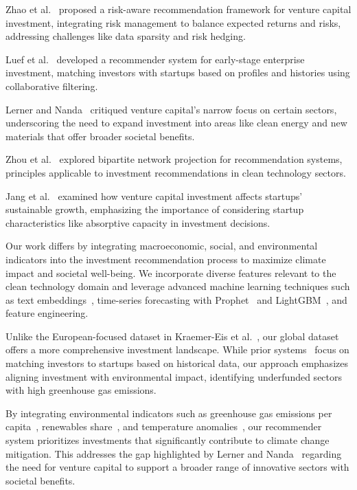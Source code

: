 \documentclass[sigconf]{acmart}
\begin{document}
Zhao et al.~\cite{ZhaoZhangWang2015} proposed a risk-aware recommendation framework for venture capital investment, integrating risk management to balance expected returns and risks, addressing challenges like data sparsity and risk hedging.

Luef et al.~\cite{LuefOhrfandlSacharidisWerthner2020} developed a recommender system for early-stage enterprise investment, matching investors with startups based on profiles and histories using collaborative filtering.

Lerner and Nanda~\cite{LernerNanda2020} critiqued venture capital's narrow focus on certain sectors, underscoring the need to expand investment into areas like clean energy and new materials that offer broader societal benefits.

Zhou et al.~\cite{ZhouRenMedoZhang2007} explored bipartite network projection for recommendation systems, principles applicable to investment recommendations in clean technology sectors.

Jang et al.~\cite{JangLeeYoon2020} examined how venture capital investment affects startups' sustainable growth, emphasizing the importance of considering startup characteristics like absorptive capacity in investment decisions.

Our work differs by integrating macroeconomic, social, and environmental indicators into the investment recommendation process to maximize climate impact and societal well-being. We incorporate diverse features relevant to the clean technology domain and leverage advanced machine learning techniques such as text embeddings~\cite{reimers-2019-sentence-bert}, time-series forecasting with Prophet~\cite{taylor2018forecasting} and LightGBM~\cite{ke2017lightgbm}, and feature engineering.

Unlike the European-focused dataset in Kraemer-Eis et al.~\cite{KraemerEisBotsariLangPal2023}, our global dataset offers a more comprehensive investment landscape. While prior systems~\cite{ZhaoZhangWang2015,LuefOhrfandlSacharidisWerthner2020} focus on matching investors to startups based on historical data, our approach emphasizes aligning investment with environmental impact, identifying underfunded sectors with high greenhouse gas emissions.

By integrating environmental indicators such as greenhouse gas emissions per capita~\cite{OWIDTotalGHGPerCapita2024}, renewables share~\cite{OWIDRenewableEnergy2023}, and temperature anomalies~\cite{OWIDTempAnomaly2024}, our recommender system prioritizes investments that significantly contribute to climate change mitigation. This addresses the gap highlighted by Lerner and Nanda~\cite{LernerNanda2020} regarding the need for venture capital to support a broader range of innovative sectors with societal benefits.
\end{document}
